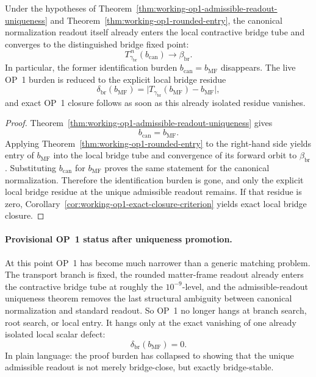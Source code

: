 \begin{corollary}
\label{cor:working-op1-structural-promotion}
Under the hypotheses of Theorem~\ref{thm:working-op1-admissible-readout-uniqueness} and Theorem~\ref{thm:working-op1-rounded-entry}, the canonical normalization readout itself already enters the local contractive bridge tube and converges to the distinguished bridge fixed point:
\[
 T_{\gamma_{\mathrm{br}}}^{\,n}(b_{\mathrm{can}})\longrightarrow \beta_{\mathrm{br}}.
\]
In particular, the former identification burden \(b_{\mathrm{can}}=b_{\mathrm{MF}}\) disappears. The live OP~1 burden is reduced to the explicit local bridge residue
\[
 \delta_{\mathrm{br}}(b_{\mathrm{MF}})=\bigl|T_{\gamma_{\mathrm{br}}}(b_{\mathrm{MF}})-b_{\mathrm{MF}}\bigr|,
\]
and exact OP~1 closure follows as soon as this already isolated residue vanishes.
\end{corollary}

\begin{proof}
Theorem~\ref{thm:working-op1-admissible-readout-uniqueness} gives
\[
 b_{\mathrm{can}}=b_{\mathrm{MF}}.
\]
Applying Theorem~\ref{thm:working-op1-rounded-entry} to the right-hand side yields entry of \(b_{\mathrm{MF}}\) into the local bridge tube and convergence of its forward orbit to \(\beta_{\mathrm{br}}\). Substituting \(b_{\mathrm{can}}\) for \(b_{\mathrm{MF}}\) proves the same statement for the canonical normalization. Therefore the identification burden is gone, and only the explicit local bridge residue at the unique admissible readout remains. If that residue is zero, Corollary~\ref{cor:working-op1-exact-closure-criterion} yields exact local bridge closure.
\end{proof}

\paragraph{Provisional OP~1 status after uniqueness promotion.}
At this point OP~1 has become much narrower than a generic matching problem. The transport branch is fixed, the rounded matter-frame readout already enters the contractive bridge tube at roughly the \(10^{-9}\)-level, and the admissible-readout uniqueness theorem removes the last structural ambiguity between canonical normalization and standard readout. So OP~1 no longer hangs at branch search, root search, or local entry. It hangs only at the exact vanishing of one already isolated local scalar defect:
\[
 \delta_{\mathrm{br}}(b_{\mathrm{MF}})=0.
\]
In plain language: the proof burden has collapsed to showing that the unique admissible readout is not merely bridge-close, but exactly bridge-stable.

\clearpage

